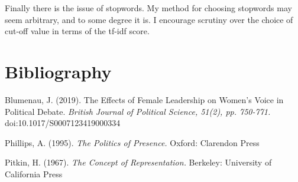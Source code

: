 \documentclass[12pt]{article}
\begin{document}
	Finally there is the issue of stopwords. My method for choosing stopwords may seem arbitrary, and to some degree it is. I encourage scrutiny over the choice of cut-off value in terms of the tf-idf score. 
	
	\section{Bibliography}
	
	{\parindent-10pt
		Blumenau, J. (2019). The Effects of Female Leadership on Women’s Voice in
		Political Debate. \textit{British Journal of Political Science, 51(2), pp. 750-771.} doi:10.1017/S0007123419000334 
		
		Phillips, A. (1995). \textit{The Politics of Presence.} Oxford: Clarendon Press
		
		Pitkin, H. (1967). \textit{The Concept of Representation.} Berkeley: University of California Press
		
	}
\end{document}
